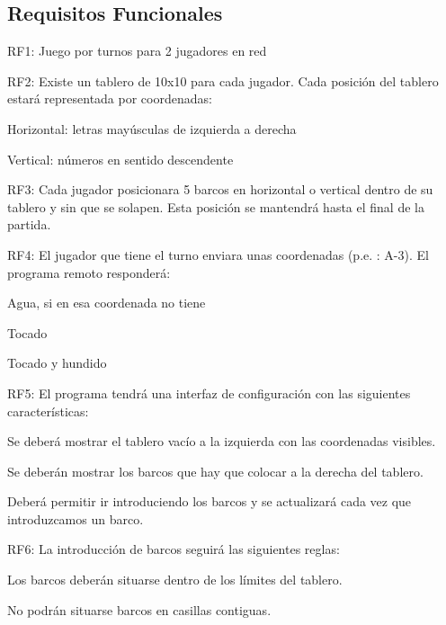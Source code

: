 \subsection*{Requisitos Funcionales}


\begin{DoxyItemize}
\item R\+F1\+: Juego por turnos para 2 jugadores en red
\item R\+F2\+: Existe un tablero de 10x10 para cada jugador. Cada posición del tablero estará representada por coordenadas\+:
\begin{DoxyItemize}
\item Horizontal\+: letras mayúsculas de izquierda a derecha
\item Vertical\+: números en sentido descendente
\end{DoxyItemize}
\item R\+F3\+: Cada jugador posicionara 5 barcos en horizontal o vertical dentro de su tablero y sin que se solapen. Esta posición se mantendrá hasta el final de la partida.
\item R\+F4\+: El jugador que tiene el turno enviara unas coordenadas (p.\+e. \+: A-\/3). El programa remoto responderá\+:
\begin{DoxyItemize}
\item Agua, si en esa coordenada no tiene
\item Tocado
\item Tocado y hundido
\end{DoxyItemize}
\item R\+F5\+: El programa tendrá una interfaz de configuración con las siguientes características\+:
\begin{DoxyItemize}
\item Se deberá mostrar el tablero vacío a la izquierda con las coordenadas visibles.
\item Se deberán mostrar los barcos que hay que colocar a la derecha del tablero.
\item Deberá permitir ir introduciendo los barcos y se actualizará cada vez que introduzcamos un barco.
\end{DoxyItemize}
\item R\+F6\+: La introducción de barcos seguirá las siguientes reglas\+:
\begin{DoxyItemize}
\item Los barcos deberán situarse dentro de los límites del tablero.
\item No podrán situarse barcos en casillas contiguas.
\end{DoxyItemize}

\end{DoxyItemize}

